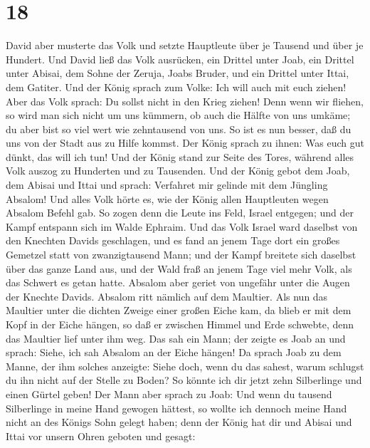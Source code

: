 \hypertarget{section-17}{%
\section{18}\label{section-17}}

 David aber musterte das Volk und setzte Hauptleute über
je Tausend und über je Hundert.  Und David ließ das Volk
ausrücken, ein Drittel unter Joab, ein Drittel unter Abisai, dem Sohne
der Zeruja, Joabs Bruder, und ein Drittel unter Ittai, dem Gatiter. Und
der König sprach zum Volke: Ich will auch mit euch ziehen!
 Aber das Volk sprach: Du sollst nicht in den Krieg
ziehen! Denn wenn wir fliehen, so wird man sich nicht um uns kümmern, ob
auch die Hälfte von uns umkäme; du aber bist so viel wert wie
zehntausend von uns. So ist es nun besser, daß du uns von der Stadt aus
zu Hilfe kommst.  Der König sprach zu ihnen: Was euch gut
dünkt, das will ich tun! Und der König stand zur Seite des Tores,
während alles Volk auszog zu Hunderten und zu Tausenden. 
Und der König gebot dem Joab, dem Abisai und Ittai und sprach: Verfahret
mir gelinde mit dem Jüngling Absalom! Und alles Volk hörte es, wie der
König allen Hauptleuten wegen Absalom Befehl gab.  So
zogen denn die Leute ins Feld, Israel entgegen; und der Kampf entspann
sich im Walde Ephraim.  Und das Volk Israel ward daselbst
von den Knechten Davids geschlagen, und es fand an jenem Tage dort ein
großes Gemetzel statt von zwanzigtausend Mann;  und der
Kampf breitete sich daselbst über das ganze Land aus, und der Wald fraß
an jenem Tage viel mehr Volk, als das Schwert es getan hatte.
 Absalom aber geriet von ungefähr unter die Augen der
Knechte Davids. Absalom ritt nämlich auf dem Maultier. Als nun das
Maultier unter die dichten Zweige einer großen Eiche kam, da blieb er
mit dem Kopf in der Eiche hängen, so daß er zwischen Himmel und Erde
schwebte, denn das Maultier lief unter ihm weg.  Das sah
ein Mann; der zeigte es Joab an und sprach: Siehe, ich sah Absalom an
der Eiche hängen!  Da sprach Joab zu dem Manne, der ihm
solches anzeigte: Siehe doch, wenn du das sahest, warum schlugst du ihn
nicht auf der Stelle zu Boden? So könnte ich dir jetzt zehn Silberlinge
und einen Gürtel geben!  Der Mann aber sprach zu Joab:
Und wenn du tausend Silberlinge in meine Hand gewogen hättest, so wollte
ich dennoch meine Hand nicht an des Königs Sohn gelegt haben; denn der
König hat dir und Abisai und Ittai vor unsern Ohren geboten und gesagt:

